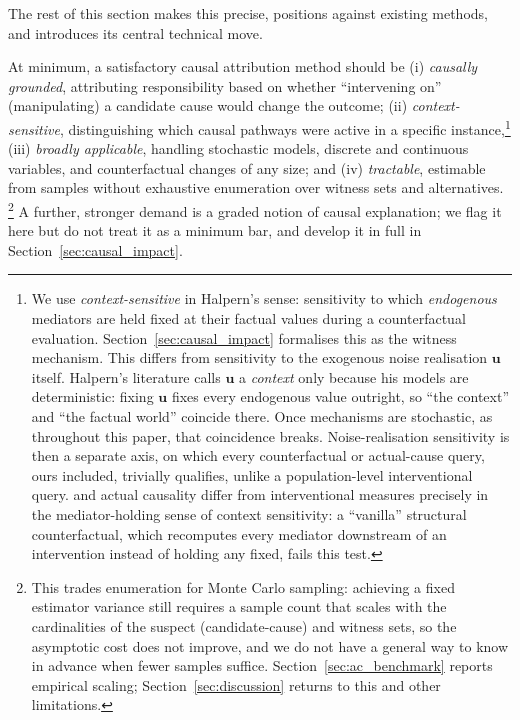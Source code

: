 The rest of this section makes this precise, positions \ourapproach{} against
existing methods, and introduces its central technical move.

At minimum, a satisfactory causal attribution method
should be \label{des:grounded}(i) \textit{causally grounded},
attributing responsibility based on whether ``intervening on'' (manipulating) a candidate cause
would change the outcome; \label{des:context}(ii) \textit{context-sensitive},
distinguishing which causal pathways were active in a specific
instance,\footnote{We use \emph{context-sensitive} in Halpern's sense: sensitivity to which
\emph{endogenous} mediators are held fixed at their factual values during a
counterfactual evaluation. Section~\ref{sec:causal_impact} formalises this as the
witness mechanism. This differs from sensitivity to the exogenous noise realisation
$\mathbf{u}$ itself. Halpern's literature calls $\mathbf{u}$ a \emph{context} only
because his models are deterministic: fixing $\mathbf{u}$ fixes every endogenous
value outright, so ``the context'' and ``the factual world'' coincide there. Once
mechanisms are stochastic, as throughout this paper, that coincidence breaks.
Noise-realisation sensitivity is then a separate axis, on which every counterfactual
or actual-cause query, ours included, trivially qualifies, unlike a population-level
interventional query. \ourapproach{} and actual causality differ from interventional
measures precisely in the mediator-holding sense of context sensitivity: a
``vanilla'' structural counterfactual, which recomputes every mediator downstream of
an intervention instead of holding any fixed, fails this test.}
\label{des:broad}(iii) \textit{broadly applicable}, handling stochastic models,
discrete and continuous variables, and counterfactual changes of any size; and
\label{des:tractable}(iv) \textit{tractable},
estimable from samples
without exhaustive enumeration over witness sets and alternatives.%
\footnote{This trades enumeration for Monte Carlo sampling: achieving a fixed
estimator variance still requires a sample count that scales with the
cardinalities of the suspect (candidate-cause) and witness sets, so the
asymptotic cost does not improve, and we do not
have a general way to know in advance when fewer samples suffice.
Section~\ref{sec:ac_benchmark} reports empirical scaling; Section~\ref{sec:discussion}
returns to this and other limitations.}
A further, stronger demand is a graded notion of causal explanation; we flag it
here but do not treat it as a minimum bar, and develop it in full in
Section~\ref{sec:causal_impact}.

